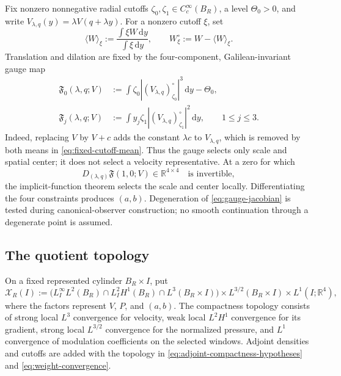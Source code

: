 \documentclass[11pt]{amsart}
\numberwithin{equation}{section}
\theoremstyle{plain}
\theoremstyle{definition}
\theoremstyle{remark}
\newcommand{\R}{\mathbb R}
\newcommand{\dd}{\,\mathrm d}
\begin{document}
Fix nonzero nonnegative radial cutoffs
\(\zeta_0,\zeta_1\in C_c^\infty(B_R)\), a level \(\Theta_0>0\), and write
\(V_{\lambda,q}(y)=\lambda V(q+\lambda y)\).  For a nonzero cutoff \(\xi\),
set
\begin{equation}\label{eq:fixed-cutoff-mean}
 \langle W\rangle_\xi
 :=\frac{\int\xi W\dd y}{\int\xi\dd y},
 \qquad W_\xi^\circ:=W-\langle W\rangle_\xi.
\end{equation}
Translation and dilation are fixed by the four-component, Galilean-invariant
gauge map
\begin{equation}\label{eq:moment-map}
 \begin{aligned}
 \mathfrak F_0(\lambda,q;V)
   &:=\int\zeta_0
       |(V_{\lambda,q})_{\zeta_0}^\circ|^3\dd y-\Theta_0,\\
 \mathfrak F_j(\lambda,q;V)
   &:=\int y_j\zeta_1
       |(V_{\lambda,q})_{\zeta_1}^\circ|^2\dd y,
   \qquad 1\le j\le3.
 \end{aligned}
\end{equation}
Indeed, replacing \(V\) by \(V+c\) adds the constant \(\lambda c\) to
\(V_{\lambda,q}\), which is removed by both means in
\eqref{eq:fixed-cutoff-mean}.  Thus the gauge selects only scale and spatial
center; it does not select a velocity representative.
At a zero for which
\begin{equation}\label{eq:gauge-jacobian}
 D_{(\lambda,q)}\mathfrak F(1,0;V)\in\R^{4\times4}
 \quad\text{is invertible},
\end{equation}
the implicit-function theorem selects the scale and center locally.
Differentiating the four constraints produces \((a,b)\).  Degeneration of
\eqref{eq:gauge-jacobian} is tested during canonical-observer construction;
no smooth continuation through a degenerate point is assumed.

\subsection{The quotient topology}

On a fixed represented cylinder \(B_R\times I\), put
\begin{equation}\label{eq:window-state-space}
 \mathcal X_R(I)
 :=\bigl(L^\infty_I L^2(B_R)\cap L^2_IH^1(B_R)
          \cap L^3(B_R\times I)\bigr)
   \times L^{3/2}(B_R\times I)
   \times L^1(I;\R^4),
\end{equation}
where the factors represent \(V\), \(P\), and \((a,b)\).  The compactness
topology consists of strong local \(L^3\) convergence for velocity, weak local
\(L^2H^1\) convergence for its gradient, strong local
\(L^{3/2}\) convergence for the normalized pressure, and \(L^1\) convergence
of modulation coefficients on the selected windows.  Adjoint densities and
cutoffs are added with the topology in
\eqref{eq:adjoint-compactness-hypotheses} and
\eqref{eq:weight-convergence}.
\end{document}

